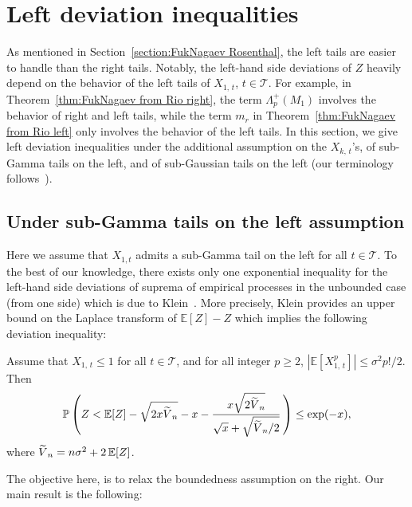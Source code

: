 \documentclass[AHL,Unicode,longabstracts,published]{cedram}
\newcommand{\bE}{\mathbb{E}}
\newcommand{\bP}{\mathbb{P}}
\newcommand{\cT}{\mathcal{T}}
\newcommand*{\MK}{\mkern 2mu}
\let\oldtilde\tilde
\renewcommand*{\tilde}[1]{\mathchoice{\widetilde{#1}}{\widetilde{#1}}{\oldtilde{#1}}{\oldtilde{#1}}}
\begin{document}
\section{Left deviation inequalities}\label{section:left deviation inequalities}
As mentioned in Section~\ref{section:FukNagaev Rosenthal}, the left tails are easier to handle than the right tails. Notably, the left-hand side deviations of $Z$ heavily depend on the behavior of the left tails of $X_{1,\,t}$, $t\in\cT$. For example, in Theorem~\ref{thm:FukNagaev from Rio right}, the term $\Lambda_p^+(M_1)$ involves the behavior of right and left tails, while the term $m_r$ in Theorem~\ref{thm:FukNagaev from Rio left} only involves the behavior of the left tails. In this section, we give left deviation inequalities under the additional assumption on the $X_{k,\,t}$'s, of sub-Gamma tails on the left, and of sub-Gaussian tails on the left (our terminology follows~\cite{BLM13}).

\subsection{Under sub-Gamma tails on the left assumption}\label{subsection:sub-Gamma}
Here we assume that $X_{1,t}$ admits a sub-Gamma tail on the left for all $t\in\cT$. To the best of our knowledge, there exists only one exponential inequality for the left-hand side deviations of suprema of empirical processes in the unbounded case (from one side) which is due to Klein~\cite{Klein02}. More precisely, Klein provides an upper bound on the Laplace transform of $\bE[Z]-Z$ which implies the following deviation inequality:
\begin{theo}[{\cite[Theorem~1.1$\MK$(3)]{Klein02}}]
Assume that $X_{1,\,t}\leq 1$ for all $t\in\cT$, and for all integer $p\geq 2$, $|\bE[X_{1,\,t}^p]|\leq \sigma^2 p!/2$. Then
\begin{equation*}
\bP\left(Z< \bE[Z] -\sqrt{2x\tilde V_n}-x-\frac{x\sqrt{2\tilde V_n}}{\sqrt{x}+\sqrt{\tilde V_n/2}}\,\right)\leq \exp(-x),
\end{equation*}
where $\tilde V_n=n\sigma^2+2\,\bE[Z]$.
\end{theo}

The objective here, is to relax the boundedness assumption on the right. Our main result is the following:
\end{document}
